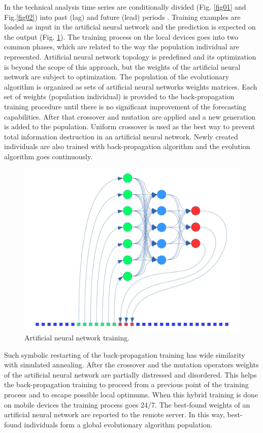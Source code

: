 \documentclass[runningheads]{llncs}
\begin{document}
%
In the technical analysis time series are conditionally divided (Fig. \ref{fig01} and Fig.\ref{fig02}) into past (lag) and future (lead) periods \cite{time-series-04}. Training examples are loaded as input in the artificial neural network \cite{time-series-04} and the prediction is expected on the output (Fig. \ref{fig03}). The training process on the local devices goes into two common phases, which are related to the way the population individual are represented. Artificial neural network topology is predefined and its optimization is beyond the scope of this approach, but the weights of the artificial neural network are subject to optimization. The population of the evolutionary algorithm is organized as sets of artificial neural networks weights matrices. Each set of weights (population individual) is provided to the back-propagation training procedure until there is no significant improvement of the forecasting capabilities. After that crossover and mutation are applied and a new generation is added to the population. Uniform crossover is used as the best way to prevent total information destruction in an artificial neural network. Newly created individuals are also trained with back-propagation algorithm and the evolution algorithm goes continuously. 
%
\begin{figure}
\includegraphics[width=\textwidth]{fig03.png}
\caption{Artificial neural network training.}
\label{fig03}
\end{figure}
%
Such symbolic restarting of the back-propagation training has wide similarity with simulated annealing. After the crossover and the mutation operators weights of the artificial neural network are partially distressed and disordered. This helps the back-propagation training to proceed from a previous point of the training process and to escape possible local optimums. When this hybrid training is done on mobile devices the training process goes 24/7. The best-found weights of an artificial neural network are reported to the remote server. In this way, best-found individuals form a global evolutionary algorithm population. 
%
\end{document}
